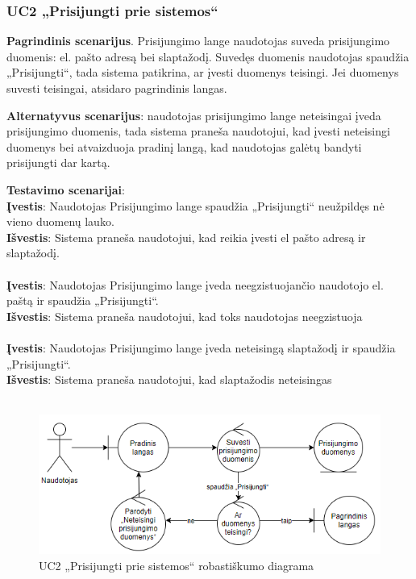 \documentclass{VUMIFPSbakalaurinis}
\begin{document}
\subsubsection{UC2 „Prisijungti prie sistemos“}
\textbf{Pagrindinis scenarijus}. Prisijungimo lange naudotojas suveda prisijungimo duomenis: el. pašto adresą bei slaptažodį. Suvedęs duomenis naudotojas spaudžia „Prisijungti“, tada sistema patikrina, ar įvesti duomenys teisingi. Jei duomenys suvesti teisingai, atsidaro pagrindinis langas.
\par \textbf{Alternatyvus scenarijus}: naudotojas prisijungimo lange neteisingai įveda prisijungimo duomenis, tada sistema praneša naudotojui, kad įvesti neteisingi duomenys bei atvaizduoja pradinį langą, kad naudotojas galėtų bandyti prisijungti dar kartą.
\par \textbf{Testavimo scenarijai}:\\
\textbf{Įvestis}: Naudotojas Prisijungimo lange spaudžia „Prisijungti“ neužpildęs nė vieno duomenų lauko. \\
\textbf{Išvestis}: Sistema praneša naudotojui, kad reikia įvesti el pašto adresą ir slaptažodį. \\ \\
\textbf{Įvestis}: Naudotojas Prisijungimo lange įveda neegzistuojančio naudotojo el. paštą ir spaudžia „Prisijungti“. \\
\textbf{Išvestis}: Sistema praneša naudotojui, kad toks naudotojas neegzistuoja\\ \\
\textbf{Įvestis}: Naudotojas Prisijungimo lange įveda neteisingą slaptažodį ir spaudžia „Prisijungti“. \\
\textbf{Išvestis}: Sistema praneša naudotojui, kad slaptažodis neteisingas\\ \\


\begin{figure}[H]
	\centering
	\includegraphics[scale=0.6]{img/Robustness/UC2}
	\caption{UC2 „Prisijungti prie sistemos“ robastiškumo diagrama}
	\label{img:uc2rob}
\end{figure}
\end{document}
